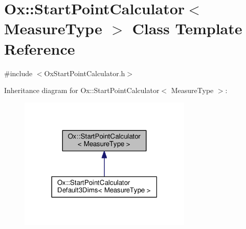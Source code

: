 \hypertarget{class_ox_1_1_start_point_calculator}{\section{Ox\-:\-:Start\-Point\-Calculator$<$ Measure\-Type $>$ Class Template Reference}
\label{class_ox_1_1_start_point_calculator}
}


{\ttfamily \#include $<$Ox\-Start\-Point\-Calculator.\-h$>$}



Inheritance diagram for Ox\-:\-:Start\-Point\-Calculator$<$ Measure\-Type $>$\-:
\nopagebreak
\begin{figure}[H]
\begin{center}
\leavevmode
\includegraphics[width=234pt]{class_ox_1_1_start_point_calculator__inherit__graph}
\end{center}
\end{figure}
